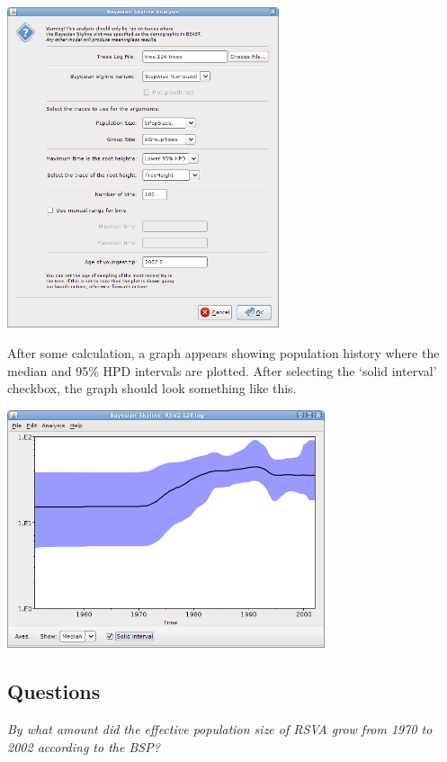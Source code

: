 \documentclass[12pt]{article}
\begin{document}
\begin{center}
\includegraphics[width=0.6\textwidth]{figures/tracerBSP2.png}
\end{center}

After some calculation, a graph appears showing population history where the median
and 95\% HPD intervals are plotted. After selecting the `solid interval' checkbox, the
graph should look something like this.

\begin{center}
\includegraphics[width=0.7\textwidth]{figures/tracerBSP3.png}
\end{center}


\subsection*{Questions}
\vspace{5 mm}

\textit{By what amount did the effective population size of RSVA grow from 1970 to 2002 according to the BSP?}
 
\end{document}
